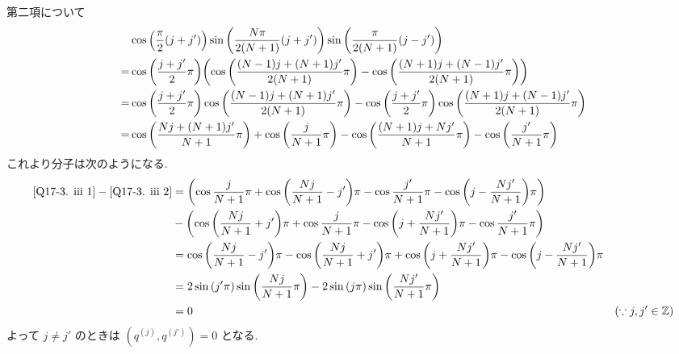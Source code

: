 \documentclass[a4paper,dvipdfmx]{jsarticle}
\theoremstyle{definition}
\newcommand{\ZZ}{\mathbb{Z}}
\begin{document}
第二項について
\begin{align}
    & \cos\qty(\frac{\pi}{2}(j + j'))\sin\qty(\frac{N\pi}{2(N+1)}(j + j'))\sin\qty(\frac{\pi}{2(N+1)}(j - j'))                                                      \\
  = & \cos\qty(\frac{j + j'}{2}\pi)\qty(\cos\qty(\frac{(N-1)j + (N+1)j'}{2(N+1)}\pi) - \cos\qty(\frac{(N+1)j + (N-1)j'}{2(N+1)}\pi))                                \\
  = & \cos\qty(\frac{j + j'}{2}\pi)\cos\qty(\frac{(N-1)j + (N+1)j'}{2(N+1)}\pi) - \cos\qty(\frac{j + j'}{2}\pi)\cos\qty(\frac{(N+1)j + (N-1)j'}{2(N+1)}\pi)         \\
  = & \cos\qty(\frac{Nj + (N+1)j'}{N+1}\pi) + \cos\qty(\frac{j}{N+1}\pi) - \cos\qty(\frac{(N+1)j + Nj'}{N+1}\pi) - \cos\qty(\frac{j'}{N+1}\pi) \label{Q17-3. iii 2}
\end{align}
これより分子は次のようになる.
\begin{align}
  \eqref{Q17-3. iii 1} - \eqref{Q17-3. iii 2} & = \qty(\cos\frac{j}{N+1}\pi + \cos\qty(\frac{Nj}{N+1} - j')\pi - \cos\frac{j'}{N+1}\pi - \cos\qty(j - \frac{Nj'}{N+1})\pi)                                           \\
                                              & - \qty(\cos\qty(\frac{Nj}{N+1} + j')\pi + \cos\frac{j}{N+1}\pi - \cos\qty(j + \frac{Nj'}{N+1})\pi - \cos\frac{j'}{N+1}\pi)                                           \\
                                              & = \cos\qty(\frac{Nj}{N+1} - j')\pi - \cos\qty(\frac{Nj}{N+1} + j')\pi + \cos\qty(j + \frac{Nj'}{N+1})\pi - \cos\qty(j - \frac{Nj'}{N+1})\pi                          \\
                                              & = 2\sin\qty(j'\pi)\sin\qty(\frac{Nj}{N+1}\pi) - 2\sin\qty(j\pi)\sin\qty(\frac{Nj'}{N+1}\pi)                                                                          \\
                                              & = 0                                                                                                                                         & (\because j, j'\in\ZZ)
\end{align}
よって $j \neq j'$ のときは $(q^{(j)}, q^{(j')}) = 0$ となる.
\end{document}
